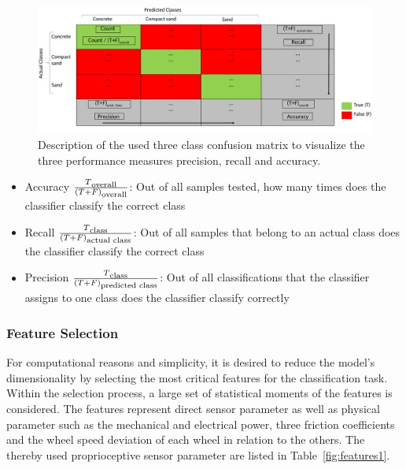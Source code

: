 \documentclass{article}
\begin{document}
\begin{figure}[!htb]
\centering
\includegraphics[width=\textwidth]{../figures/CM_Description.pdf}
\caption{\label{fig:CMdescrpit}Description of the used three class confusion matrix to visualize the three performance measures precision, recall and accuracy.\cite{kuhr2021}}
\end{figure}
\begin{itemize}
\item Accuracy $\frac{T\textsubscript{overall}}{(T+F)\textsubscript{overall}}$: Out of all samples tested, how many times does the classifier classify the correct class
\item Recall $\frac{T\textsubscript{class}}{(T+F)\textsubscript{actual class}}$: Out of all samples that belong to an actual class does the classifier classify the correct class 
\item Precision $\frac{T\textsubscript{class}}{(T+F)\textsubscript{predicted class}}$: Out of all classifications that the classifier assigns to one class does the classifier classify correctly
\end{itemize}

\subsubsection{Feature Selection}
For computational reasons and simplicity, it is desired to reduce the model's dimensionality by selecting the most critical features for the  classification task. 
Within the selection process, a large set of statistical moments of the features is considered. The features represent direct sensor parameter as well as physical parameter such as the mechanical and electrical power, three friction coefficients and the wheel speed deviation of each wheel in relation to the others. The thereby used proprioceptive sensor parameter are listed in Table~\ref{fig:features1}.
\end{document}
